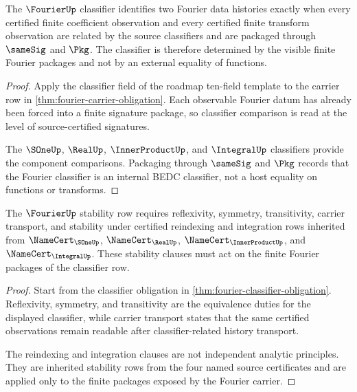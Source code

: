\begin{theorem}\label{thm:fourier-classifier-obligation}
The $\FourierUp$ classifier identifies two Fourier data histories exactly when every certified finite coefficient observation and every certified finite transform observation are related by the source classifiers and are packaged through $\sameSig$ and $\Pkg$. The classifier is therefore determined by the visible finite Fourier packages and not by an external equality of functions.
\end{theorem}
\begin{proof}
Apply the classifier field of the roadmap ten-field template to the carrier row in \autoref{thm:fourier-carrier-obligation}. Each observable Fourier datum has already been forced into a finite signature package, so classifier comparison is read at the level of source-certified signatures.

The $\SOneUp$, $\RealUp$, $\InnerProductUp$, and $\IntegralUp$ classifiers provide the component comparisons. Packaging through $\sameSig$ and $\Pkg$ records that the Fourier classifier is an internal BEDC classifier, not a host equality on functions or transforms.
\end{proof}

\begin{theorem}\label{thm:fourier-stability-obligation}
The $\FourierUp$ stability row requires reflexivity, symmetry, transitivity, carrier transport, and stability under certified reindexing and integration rows inherited from $\NameCert_{\SOneUp}$, $\NameCert_{\RealUp}$, $\NameCert_{\InnerProductUp}$, and $\NameCert_{\IntegralUp}$. These stability clauses must act on the finite Fourier packages of the classifier row.
\end{theorem}
\begin{proof}
Start from the classifier obligation in \autoref{thm:fourier-classifier-obligation}. Reflexivity, symmetry, and transitivity are the equivalence duties for the displayed classifier, while carrier transport states that the same certified observations remain readable after classifier-related history transport.

The reindexing and integration clauses are not independent analytic principles. They are inherited stability rows from the four named source certificates and are applied only to the finite packages exposed by the Fourier carrier.
\end{proof}

